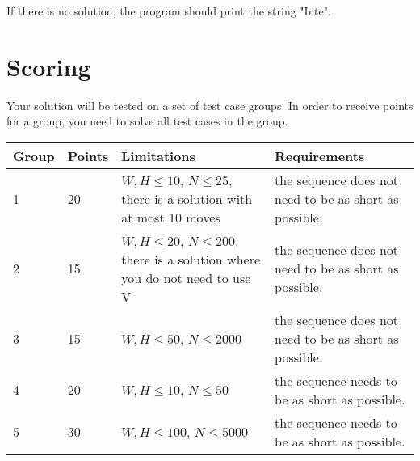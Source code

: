 If there is no solution, the program should print the string "Inte".

\section*{Scoring}
Your solution will be tested on a set of test case groups. In order to receive points for a group, you need to solve all test cases in the group.

\begin{tabular}{| l | l | l | l |}
	\hline
	Group & Points & Limitations & Requirements \\ \hline
  1     & 20  & $W,H \le 10$, $N \le 25$, there is a solution with at most 10 moves & the sequence does not need to be as short as possible. \\ \hline
  2     & 15  & $W,H \le 20$, $N \le 200$, there is a solution where you do not need to use V & the sequence does not need to be as short as possible. \\ \hline
  3     & 15  & $W,H \le 50$, $N \le 2000$ & the sequence does not need to be as short as possible. \\ \hline
  4     & 20  & $W,H \le 10$, $N \le 50$ & the sequence needs to be as short as possible. \\ \hline
  5     & 30  & $W,H \le 100$, $N \le 5000$ & the sequence needs to be as short as possible. \\ \hline
\end{tabular}
